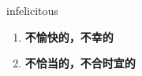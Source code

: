
\begin{frame}
{\huge infelicitous}
\begin{center}
\begin{enumerate}\Large
  \item \textbf{不愉快的，不幸的}
  \item \textbf{不恰当的，不合时宜的}
\end{enumerate}
\end{center}
\end{frame}
